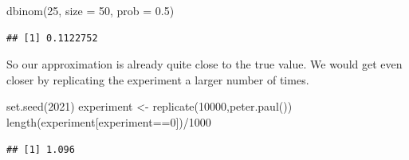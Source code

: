 \documentclass[
]{book}
\newenvironment{Shaded}{\begin{snugshade}}{\end{snugshade}}
\newcommand{\AttributeTok}[1]{\textcolor[rgb]{0.77,0.63,0.00}{#1}}
\newcommand{\DecValTok}[1]{\textcolor[rgb]{0.00,0.00,0.81}{#1}}
\newcommand{\FloatTok}[1]{\textcolor[rgb]{0.00,0.00,0.81}{#1}}
\newcommand{\FunctionTok}[1]{\textcolor[rgb]{0.00,0.00,0.00}{#1}}
\newcommand{\NormalTok}[1]{#1}
\newcommand{\OtherTok}[1]{\textcolor[rgb]{0.56,0.35,0.01}{#1}}
\newcommand{\SpecialCharTok}[1]{\textcolor[rgb]{0.00,0.00,0.00}{#1}}
\begin{document}
\begin{Shaded}
\begin{Highlighting}[]
\FunctionTok{dbinom}\NormalTok{(}\DecValTok{25}\NormalTok{, }\AttributeTok{size =} \DecValTok{50}\NormalTok{, }\AttributeTok{prob =} \FloatTok{0.5}\NormalTok{)}
\end{Highlighting}
\end{Shaded}

\begin{verbatim}
## [1] 0.1122752
\end{verbatim}

So our approximation is already quite close to the true value. We would get even closer by replicating the experiment a larger number of times.

\begin{Shaded}
\begin{Highlighting}[]
\FunctionTok{set.seed}\NormalTok{(}\DecValTok{2021}\NormalTok{)}
\NormalTok{experiment }\OtherTok{\textless{}{-}} \FunctionTok{replicate}\NormalTok{(}\DecValTok{10000}\NormalTok{,}\FunctionTok{peter.paul}\NormalTok{())}
\FunctionTok{length}\NormalTok{(experiment[experiment}\SpecialCharTok{==}\DecValTok{0}\NormalTok{])}\SpecialCharTok{/}\DecValTok{1000}
\end{Highlighting}
\end{Shaded}

\begin{verbatim}
## [1] 1.096
\end{verbatim}

  
\end{document}
